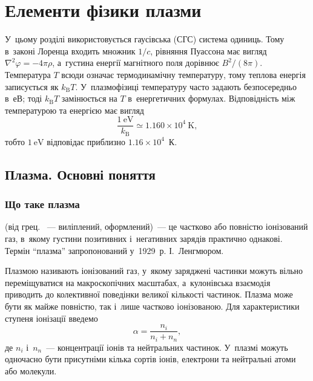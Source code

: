 
\chapter{Елементи фізики плазми}\label{\currfilebase}\hypertarget{PlasmaPhysics}{}
\graphicspath{{\currfilebase/Pictures}}

У~цьому розділі використовується гаусівська (СГС) система одиниць. Тому в~законі Лоренца входить множник $1/c$, рівняння Пуассона має вигляд $\nabla^2\varphi=-4\pi\rho$, а~густина енергії магнітного поля дорівнює $B^2/(8\pi)$. Температура $T$ всюди означає термодинамічну температуру, тому теплова енергія записується як $k_{\mathrm B}T$. У~плазмофізиці температуру часто задають безпосередньо в~еВ; тоді $k_{\mathrm B}T$ замінюється на $T$ в~енергетичних формулах. Відповідність між температурою та енергією має вигляд
\begin{equation}
	\frac{1~\mathrm{eV}}{k_{\mathrm B}}
	\simeq 1.160\times10^4~\mathrm{K},
\end{equation}
тобто $1~\mathrm{eV}$ відповідає приблизно $1.16\times10^4$~К.

\section{Плазма. Основні поняття}\label{sec:plasma-basics}\hypertarget{plasma-basics}{}

\subsection{Що таке плазма}

 (від грец. ~--- виліплений, оформлений)~--- це частково або повністю іонізований газ, в~якому густини позитивних і~негативних зарядів практично однакові. Термін \enquote{плазма} запропонований у~1929~р. І.~Ленгмюром.

Плазмою називають іонізований газ, у~якому заряджені частинки можуть вільно переміщуватися на макроскопічних масштабах, а~кулонівська взаємодія приводить до колективної поведінки великої кількості частинок. Плазма може бути як майже повністю, так і~лише частково іонізованою. Для характеристики ступеня іонізації введемо
\begin{equation}
	\alpha = \frac{n_i}{n_i+n_n},
\end{equation}
де $n_i$ і~$n_n$~--- концентрації іонів та нейтральних частинок. У~плазмі можуть одночасно бути присутніми кілька сортів іонів, електрони та нейтральні атоми або молекули.

